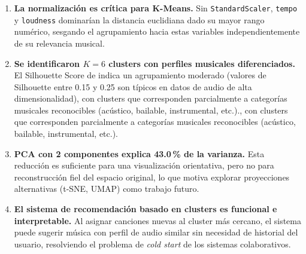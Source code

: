 \documentclass[12pt, a4paper]{article}
\begin{document}
\begin{enumerate}
  \item \textbf{La normalización es crítica para K-Means.} Sin
        \texttt{StandardScaler}, \texttt{tempo} y \texttt{loudness}
        dominarían la distancia euclidiana dado su mayor rango numérico,
        sesgando el agrupamiento hacia estas variables
        independientemente de su relevancia musical.

  \item \textbf{Se identificaron $K = 6$ clusters con perfiles
        musicales diferenciados.} El Silhouette Score de 
        indica un agrupamiento moderado (valores de Silhouette entre 0.15 y 0.25 son típicos en datos de audio de alta dimensionalidad), con clusters que corresponden parcialmente a categorías musicales reconocibles (acústico, bailable, instrumental, etc.)., con
        clusters que corresponden parcialmente a categorías musicales
        reconocibles (acústico, bailable, instrumental, etc.).

  \item \textbf{PCA con 2 componentes explica 43.0\,\% de la
        varianza.} Esta reducción es suficiente para una visualización
        orientativa, pero no para reconstrucción fiel del espacio
        original, lo que motiva explorar proyecciones alternativas
        (t-SNE, UMAP) como trabajo futuro.

  \item \textbf{El sistema de recomendación basado en clusters es
        funcional e interpretable.} Al asignar canciones nuevas al
        cluster más cercano, el sistema puede sugerir música con perfil
        de audio similar sin necesidad de historial del usuario,
        resolviendo el problema de \textit{cold start} de los sistemas
        colaborativos.
\end{enumerate}
\end{document}
